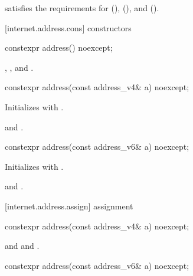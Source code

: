 \pnum
{} satisfies the requirements for  (),  (), and  ().


[internet.address.cons]{ constructors}

\begin{itemdecl}
constexpr address() noexcept;
\end{itemdecl}

\begin{itemdescr}
\pnum
\postconditions {}, , and .
\end{itemdescr}

\begin{itemdecl}
constexpr address(const address_v4& a) noexcept;
\end{itemdecl}

\begin{itemdescr}
\pnum
\effects Initializes  with .

\pnum
\postconditions {} and .
\end{itemdescr}

\begin{itemdecl}
constexpr address(const address_v6& a) noexcept;
\end{itemdecl}

\begin{itemdescr}
\pnum
\effects Initializes  with .

\pnum
\postconditions {} and .
\end{itemdescr}



[internet.address.assign]{ assignment}

\begin{itemdecl}
constexpr address(const address_v4& a) noexcept;
\end{itemdecl}

\begin{itemdescr}
\pnum
\postconditions {} and  and .

\pnum
\returns {}
\end{itemdescr}

\begin{itemdecl}
constexpr address(const address_v6& a) noexcept;
\end{itemdecl}

